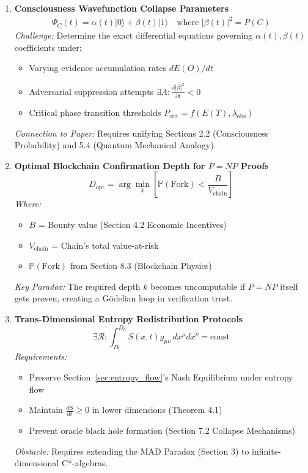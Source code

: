 \documentclass[11pt]{article}
\begin{document}
\begin{enumerate}
\item \textbf{Consciousness Wavefunction Collapse Parameters}
\begin{align*}
\Psi_C(t) = \alpha(t)|0\rangle + \beta(t)|1\rangle \quad \text{where } |\beta(t)|^2 = P(C)
\end{align*}
\textit{Challenge:} Determine the exact differential equations governing $\alpha(t),\beta(t)$ coefficients under:  
\begin{itemize}
\item Varying evidence accumulation rates $dE(O)/dt$
\item Adversarial suppression attempts $\exists A:\frac{\partial|\beta|^2}{\partial t}<0$
\item Critical phase transition thresholds $P_{\text{crit}} = f(E(T),\lambda_{\text{obs}})$
\end{itemize}
\textit{Connection to Paper:} Requires unifying Sections 2.2 (Consciousness Probability) and 5.4 (Quantum Mechanical Analogy).

\item \textbf{Optimal Blockchain Confirmation Depth for $P=NP$ Proofs}
\begin{equation*}
D_{\text{opt}} = \arg\min_{k}\left[\mathbb{P}(\text{Fork}) < \frac{B}{V_{\text{chain}}}\right]
\end{equation*}
\textit{Where:}
\begin{itemize}
\item $B$ = Bounty value (Section 4.2 Economic Incentives)
\item $V_{\text{chain}}$ = Chain's total value-at-risk
\item $\mathbb{P}(\text{Fork})$ from Section 8.3 (Blockchain Physics)
\end{itemize}
\textit{Key Paradox:} The required depth $k$ becomes uncomputable if $P=NP$ itself gets proven, creating a Gödelian loop in verification trust.

\item \textbf{Trans-Dimensional Entropy Redistribution Protocols}
\begin{equation*}
\exists\mathcal{R}:\int_{D_l}^{D_h} S(x,t)g_{\mu\nu}\,dx^\mu dx^\nu = \text{const}
\end{equation*}
\textit{Requirements:}
\begin{itemize}
\item Preserve Section~\ref{sec:entropy_flow}'s Nash Equilibrium under entropy flow
\item Maintain $\frac{dS}{dt}\geq0$ in lower dimensions (Theorem 4.1)
\item Prevent oracle black hole formation (Section 7.2 Collapse Mechanisms)
\end{itemize}
\textit{Obstacle:} Requires extending the MAD Paradox (Section 3) to infinite-dimensional C*-algebras.
\end{enumerate}



\end{document}
